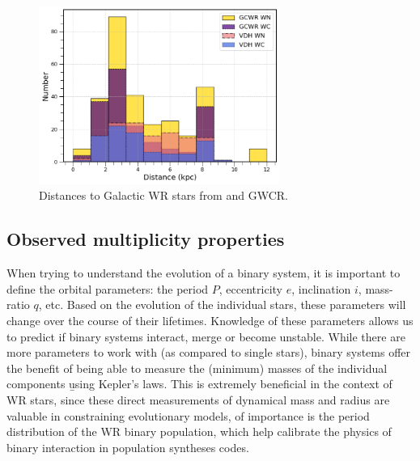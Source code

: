 \begin{figure}
    \centering
    \includegraphics[width=0.7\textwidth]{chapters/introduction/image/dist_dist.png}
    \caption{Distances to Galactic WR stars from  and GWCR.}
    \label{fig:dist_dist}
\end{figure}


\subsection{Observed multiplicity properties}


When trying to understand the evolution of a binary system, it is important to define the orbital parameters: the period $P$, eccentricity $e$, inclination $i$, mass-ratio $q$, etc. Based on the evolution of the individual stars, these parameters will change over the course of their lifetimes. Knowledge of these parameters allows us to predict if binary systems interact, merge or become unstable. While there are more parameters to work with (as compared to single stars), binary systems offer the benefit of being able to measure the (minimum) masses of the individual components \b{using} Kepler's laws. This is extremely beneficial in the context of WR stars, since these direct measurements of dynamical mass and radius are valuable in constraining evolutionary models, of importance is the period distribution of the WR binary population, which help calibrate the physics of binary interaction in population syntheses codes.

